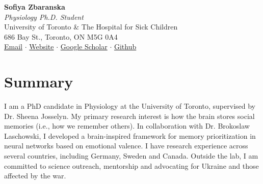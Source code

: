 \documentclass[12pt]{article}
\begin{document}
\begin{center}
    {\Large\textbf{Sofiya Zbaranska}} \\ \vspace{1.5pt}
    \textit{Physiology Ph.D. Student} \\ 
    University of Toronto \& The Hospital for Sick Children \\ 
    686 Bay St., Toronto, ON M5G 0A4 \\ \vspace{5pt}
    \href{mailto:sofiya.zbaranska@mail.utoronto.ca}{Email} $\cdot$ 
    \href{https://neur1s.github.io}{Website} $\cdot$ 
    \href{https://scholar.google.com/citations?user=7ZBuO4wAAAAJ&hl=en}{Google Scholar} $\cdot$  
    \href{https://github.com/neur1s}{Github} \\ \vspace{5pt}
\end{center}

\section*{Summary}
I am a PhD candidate in Physiology at the University of Toronto, supervised by Dr. Sheena Josselyn. My primary research interest is how the brain stores social memories (i.e., how we remember others). In collaboration with Dr. Brokoslaw Laschowski, I developed a brain-inspired framework for memory prioritization in neural networks based on emotional valence. I have research experience across several countries, including Germany, Sweden and Canada. Outside the lab, I am committed to science outreach, mentorship and advocating for Ukraine and those affected by the war.

\end{document}
